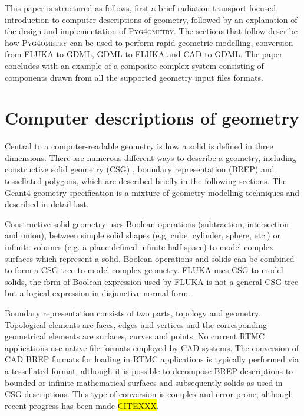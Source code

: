 \documentclass[final,5p,times,twocolumn]{elsarticle}
\newcommand{\PYGEOMETRY}{\textsc{Pyg4ometry}}
\begin{document}
This paper is structured as follows, first a brief radiation transport focused introduction to computer descriptions of geometry, followed by an explanation of the design and implementation of \PYGEOMETRY{}. The sections that follow describe how \PYGEOMETRY{} can be used to perform rapid geometric modelling, conversion from FLUKA to GDML, GDML to FLUKA and CAD to GDML. The paper concludes with an example of a composite complex system consisting of components drawn from all the supported  geometry input files formats.

\section{Computer descriptions of geometry} \label{sec:geometric}
Central to a computer-readable geometry is how a solid is defined in three dimensions. There are numerous different ways to describe a
geometry, including constructive solid geometry (CSG) , boundary representation (BREP) and tessellated polygons, which are described 
briefly in the following sections.  The Geant4 geometry specification is a mixture of geometry modelling techniques and described in detail last.

Constructive solid geometry uses Boolean operations (subtraction, intersection and union), between simple solid shapes (e.g. cube, cylinder, sphere, etc.) or infinite
volumes (e.g. a plane-defined infinite half-space) to model complex surfaces which represent a solid. Boolean operations and solids can be combined to form a 
CSG tree to model complex geometry. FLUKA uses CSG to model solids, the form of Boolean expression used by FLUKA is not a general CSG tree but a 
logical expression in disjunctive normal form.

Boundary representation consists of two parts, topology and geometry. Topological elements are faces, edges and vertices and the corresponding
geometrical elements are surfaces, curves and points. No current RTMC applications use native file formats employed by CAD systems. The conversion of 
CAD BREP formats for loading in RTMC applications is typically performed via a tessellated format, although it is possible to decompose BREP descriptions
 to bounded or infinite mathematical surfaces and subsequently solids as used in CSG descriptions. This type of conversion is complex and error-prone, 
 although recent progress has been made \colorbox{yellow}{CITEXXX}.
\end{document}
